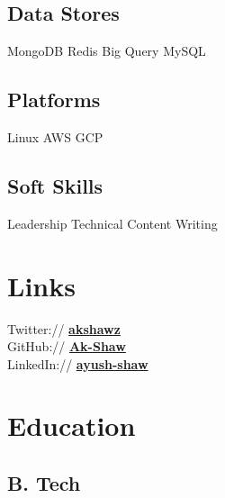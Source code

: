 \documentclass[]{deedy-resume-openfont}
\begin{document}
\begin{minipage}[t]{0.33\textwidth}
\subsection{Data Stores}
MongoDB \textbullet{} Redis \textbullet{} Big Query \textbullet{} MySQL
\sectionsep

\subsection{Platforms}
Linux \textbullet{} AWS \textbullet{} GCP 
\sectionsep

\subsection{Soft Skills}
Leadership \textbullet{} Technical Content Writing 
\sectionsep


\section{Links} 
Twitter:// \href{https://twitter.com/akshawz}{\bf akshawz} \\
GitHub://  \href{https://github.com/Ak-Shaw}{\bf Ak-Shaw} \\
LinkedIn://  \href{https://www.linkedin.com/in/ayush-shaw}{\bf ayush-shaw} \\


\section{Education} 


\subsection{B. Tech} 
\sectionsep


\end{minipage}
\end{document}
